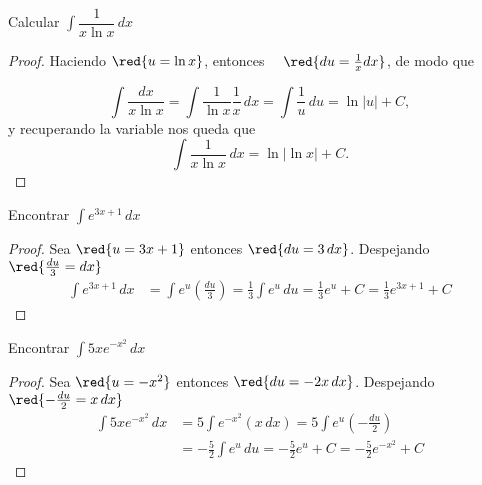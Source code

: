 

 \begin{Ejemplo} Calcular  $\displaystyle\int{\dfrac{1}{x\ln x}}\, dx$  \end{Ejemplo}
\begin{proof}
 Haciendo  $\red{u=\ln x}$,   entonces \ \ $\red{du=\frac{1}{x}dx}$,   de modo que

\begin{equation*}
\int \frac{dx}{x\ln x} =\int \frac{1}{\ln x}\frac{1}{x}\,dx   = \int \frac{1}{u}\,du
 = \ln |u|+ C,
\end{equation*}
 y recuperando la variable nos queda que
\begin{equation*}
\int \frac{1}{x\ln x}\,dx= \ln |\ln x| + C.
\end{equation*}
\end{proof}

 
%




 \begin{Ejemplo} Encontrar $\displaystyle\int e^{3x+1}\,dx$ 
 \end{Ejemplo}
\begin{proof}
 Sea $\red{u=3x+1}$  entonces $ \red{du=3\,dx }$. Despejando \ \ $\red{\frac{du}{3}=dx} $
\begin{align*}
 \int e^{3x+1}\,dx & =\int e^{u}\left(\frac{du}{3}\right)  =\frac{1}{3}\int
e^{u}\,du  =\frac{1}{3}e^{u}+C =\frac{1}{3}e^{3x+1}+C
\end{align*}
\end{proof}


\begin{Ejemplo} Encontrar $\displaystyle\int 5xe^{-x^2}\,dx$  
\end{Ejemplo}
\begin{proof}
 Sea $\red{u=-x^{2}}$   entonces  $ \red{du=-2x\,dx}$. Despejando $ \red{-\frac{du}{2}=x\,dx}$
\begin{align*}
 \int 5xe^{-x^2}\,dx  &=5\int e^{-x^2}(x\,dx)=5\int e^{u}\left(-\frac{du}{2}\right)  \\ &=-\frac{5}{2}\int
e^{u}\,du =-\frac{5}{2}e^{u}+C  =-\frac{5}{2}e^{-x^2}+C
\end{align*}
\end{proof}


